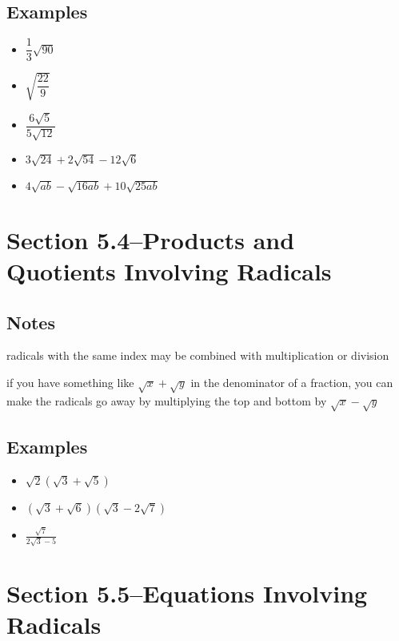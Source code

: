 \documentclass[fleqn,addpoints]{exam}
\begin{document}
\subsection{Examples}
\begin{itemize}
  \item \( \dfrac{1}{3}\sqrt{90} \)
  \item \( \sqrt{\dfrac{22}{9}} \)
  \item \( \dfrac{6\sqrt{5}}{5\sqrt{12}}\)
  \item \( 3\sqrt{24} + 2\sqrt{54} - 12\sqrt{6} \)
  \item \( 4\sqrt{ab} - \sqrt{16ab} + 10\sqrt{25ab} \)
\end{itemize}

\section{Section 5.4--Products and Quotients Involving Radicals}

\subsection{Notes}

\begin{itemize*}
  \item radicals with the same index may be combined with multiplication or division
  \item if you have something like $\sqrt{x} + \sqrt{y}$ in the denominator of a fraction, you can make the radicals go
    away by multiplying the top and bottom by $\sqrt{x} - \sqrt{y}$
\end{itemize*}

\subsection{Examples}
\begin{itemize}
  \item \( \sqrt{2} (\sqrt{3} + \sqrt{5}) \)
  \item \( (\sqrt{3} + \sqrt{6})(\sqrt{3} - 2\sqrt{7}) \)
  \item \( \displaystyle \frac{\sqrt{7}}{2\sqrt{3} - 5} \)
\end{itemize}


\section{Section 5.5--Equations Involving Radicals}
\end{document}
